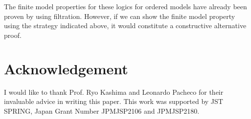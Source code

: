\documentclass{article}
\theoremstyle{definition}
\begin{document}
The finite model properties for these logics for ordered models have already been proven by \cite{blackburn1993} using filtration. 
However, if we can show the finite model property using the strategy indicated above, it would constitute a constructive alternative proof.

\section*{Acknowledgement}
I would like to thank Prof. Ryo Kashima and Leonardo Pacheco for their invaluable advice in writing this paper. This work was supported by JST SPRING, Japan Grant Number JPMJSP2106 and JPMJSP2180.
\newpage



\end{document}

